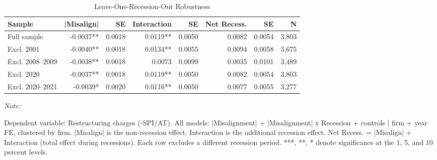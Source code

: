 \documentclass[
  10pt,
]{article}
\begin{document}
\newpage

\begin{table}[!h]
\centering
\caption{\label{tab:table8}Leave-One-Recession-Out Robustness}
\centering
\fontsize{9}{11}\selectfont
\begin{threeparttable}
\begin{tabular}[t]{lrrrrrrr}
\toprule
Sample & |Misalign| & SE & Interaction & SE & Net Recess. & SE & N\\
\midrule
Full sample & -0.0037** & 0.0018 & 0.0119** & 0.0050 & 0.0082 & 0.0054 & 3,803\\
Excl. 2001 & -0.0040** & 0.0018 & 0.0134** & 0.0055 & 0.0094 & 0.0058 & 3,675\\
Excl. 2008--2009 & -0.0038** & 0.0018 & 0.0073 & 0.0099 & 0.0035 & 0.0101 & 3,489\\
Excl. 2020 & -0.0037** & 0.0018 & 0.0119** & 0.0050 & 0.0082 & 0.0054 & 3,803\\
Excl. 2020--2021 & -0.0039* & 0.0020 & 0.0116** & 0.0050 & 0.0077 & 0.0055 & 3,277\\
\bottomrule
\end{tabular}
\begin{tablenotes}[para]
\item \textit{Note: } 
\item Dependent variable: Restructuring charges (-SPI/AT). All models: |Misalignment| + |Misalignment| x Recession + controls | firm + year FE, clustered by firm. |Misalign| is the non-recession effect. Interaction is the additional recession effect. Net Recess. = |Misalign| + Interaction (total effect during recessions). Each row excludes a different recession period. ***, **, * denote significance at the 1, 5, and 10 percent levels.
\end{tablenotes}
\end{threeparttable}
\end{table}
\end{document}
